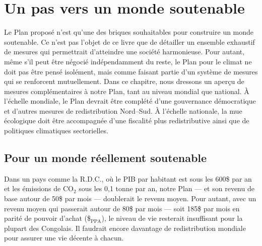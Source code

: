 \documentclass[a5paper,french]{memoir}
\begin{document}
\chapter{Un pas vers un monde soutenable\label{ch:premier_pas}} %

Le Plan proposé n'est qu'une des briques souhaitables pour construire un monde soutenable. Ce n'est pas l'objet de ce livre que de détailler un ensemble exhaustif de mesures qui permettrait d'atteindre une société harmonieuse. Pour autant, même s'il peut être négocié indépendamment du reste, le Plan pour le climat ne doit pas être pensé isolément, mais comme faisant partie d'un système de mesures qui se renforcent mutuellement. Dans ce chapitre, nous dressons un aperçu de mesures complémentaires à notre Plan, tant au niveau mondial que national. À l'échelle mondiale, le Plan devrait être complété d'une gouvernance démocratique et d'autres mesures de redistribution Nord--Sud. À l'échelle nationale, la mue écologique doit être accompagnée d'une fiscalité plus redistributive ainsi que de politiques climatiques sectorielles. 

\section{Pour un monde réellement soutenable}

Dans un pays comme la R.D.C., où le PIB par habitant est sous les 600\$ par an et les émissions de CO$_\text{2}$ sous les 0,1 tonne par an, notre Plan --- et son revenu de base autour de 50\$ par mois --- doublerait le revenu moyen. %
Pour autant, avec un revenu moyen qui passerait autour de 80\$ par mois --- soit 185\$ par mois en parité de pouvoir d'achat (\$$_\text{PPA}$), le niveau de vie resterait insuffisant pour la plupart des Congolais. Il faudrait encore davantage de redistribution mondiale pour assurer une vie décente à chacun. 
\end{document}
